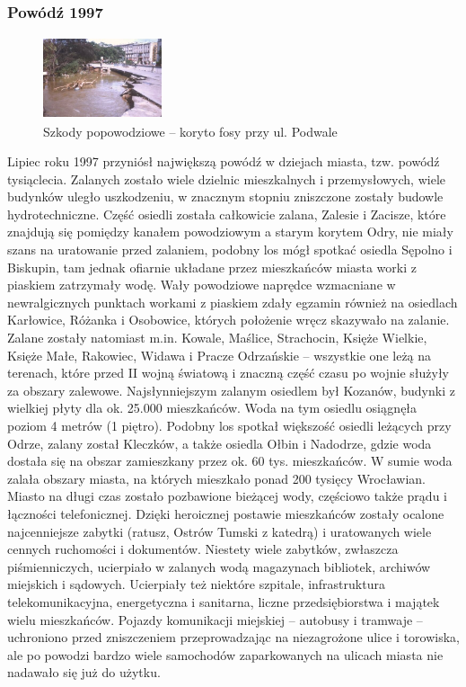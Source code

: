\documentclass{article}
\begin{document}
\subsubsection{Powódź 1997}

\begin{figure}
\includegraphics[width= 3.5cm, height= 2.4cm]{images/Zdjecie20.jpg}
\caption{Szkody popowodziowe – koryto fosy przy ul. Podwale}
\end{figure}

Lipiec roku 1997 przyniósł największą powódź w dziejach miasta, tzw. powódź tysiąclecia. Zalanych zostało wiele dzielnic mieszkalnych i przemysłowych, wiele budynków uległo uszkodzeniu, w znacznym stopniu zniszczone zostały budowle hydrotechniczne. Część osiedli została całkowicie zalana, Zalesie i Zacisze, które znajdują się pomiędzy kanałem powodziowym a starym korytem Odry, nie miały szans na uratowanie przed zalaniem, podobny los mógł spotkać osiedla Sępolno i Biskupin, tam jednak ofiarnie układane przez mieszkańców miasta worki z piaskiem zatrzymały wodę. Wały powodziowe naprędce wzmacniane w newralgicznych punktach workami z piaskiem zdały egzamin również na osiedlach Karłowice, Różanka i Osobowice, których położenie wręcz skazywało na zalanie. Zalane zostały natomiast m.in. Kowale, Maślice, Strachocin, Księże Wielkie, Księże Małe, Rakowiec, Widawa i Pracze Odrzańskie – wszystkie one leżą na terenach, które przed II wojną światową i znaczną część czasu po wojnie służyły za obszary zalewowe. Najsłynniejszym zalanym osiedlem był Kozanów, budynki z wielkiej płyty dla ok. 25.000 mieszkańców. Woda na tym osiedlu osiągnęła poziom 4 metrów (1 piętro). Podobny los spotkał większość osiedli leżących przy Odrze, zalany został Kleczków, a także osiedla Ołbin i Nadodrze, gdzie woda dostała się na obszar zamieszkany przez ok. 60 tys. mieszkańców. W sumie woda zalała obszary miasta, na których mieszkało ponad 200 tysięcy Wrocławian. Miasto na długi czas zostało pozbawione bieżącej wody, częściowo także prądu i łączności telefonicznej. Dzięki heroicznej postawie mieszkańców zostały ocalone najcenniejsze zabytki (ratusz, Ostrów Tumski z katedrą) i uratowanych wiele cennych ruchomości i dokumentów. Niestety wiele zabytków, zwłaszcza piśmienniczych, ucierpiało w zalanych wodą magazynach bibliotek, archiwów miejskich i sądowych. Ucierpiały też niektóre szpitale, infrastruktura telekomunikacyjna, energetyczna i sanitarna, liczne przedsiębiorstwa i majątek wielu mieszkańców. Pojazdy komunikacji miejskiej – autobusy i tramwaje – uchroniono przed zniszczeniem przeprowadzając na niezagrożone ulice i torowiska, ale po powodzi bardzo wiele samochodów zaparkowanych na ulicach miasta nie nadawało się już do użytku.
\end{document}

